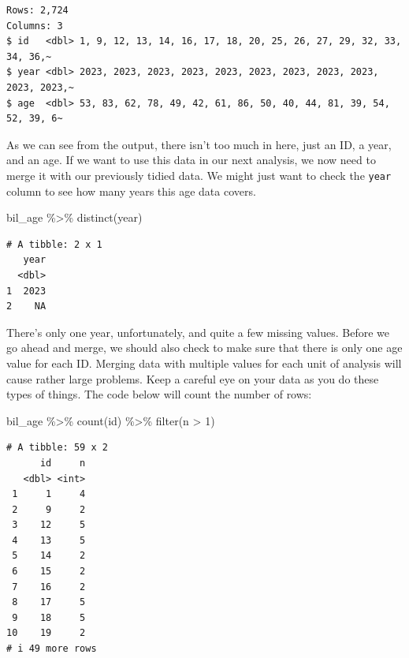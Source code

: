 \documentclass[
  letterpaper,
]{book}
\newenvironment{Shaded}{\begin{snugshade}}{\end{snugshade}}
\newcommand{\CommentTok}[1]{\textcolor[rgb]{0.37,0.37,0.37}{#1}}
\newcommand{\DecValTok}[1]{\textcolor[rgb]{0.68,0.00,0.00}{#1}}
\newcommand{\FunctionTok}[1]{\textcolor[rgb]{0.28,0.35,0.67}{#1}}
\newcommand{\NormalTok}[1]{\textcolor[rgb]{0.00,0.23,0.31}{#1}}
\newcommand{\SpecialCharTok}[1]{\textcolor[rgb]{0.37,0.37,0.37}{#1}}
\begin{document}
\begin{verbatim}
Rows: 2,724
Columns: 3
$ id   <dbl> 1, 9, 12, 13, 14, 16, 17, 18, 20, 25, 26, 27, 29, 32, 33, 34, 36,~
$ year <dbl> 2023, 2023, 2023, 2023, 2023, 2023, 2023, 2023, 2023, 2023, 2023,~
$ age  <dbl> 53, 83, 62, 78, 49, 42, 61, 86, 50, 40, 44, 81, 39, 54, 52, 39, 6~
\end{verbatim}

As we can see from the output, there isn't too much in here, just an ID,
a year, and an age. If we want to use this data in our next analysis, we
now need to merge it with our previously tidied data. We might just want
to check the \texttt{year} column to see how many years this age data
covers.

\begin{Shaded}
\begin{Highlighting}[]
\NormalTok{bil\_age }\SpecialCharTok{\%\textgreater{}\%}
  \FunctionTok{distinct}\NormalTok{(year)}
\end{Highlighting}
\end{Shaded}

\begin{verbatim}
# A tibble: 2 x 1
   year
  <dbl>
1  2023
2    NA
\end{verbatim}

\begin{Shaded}
\end{Shaded}

There's only one year, unfortunately, and quite a few missing values.
Before we go ahead and merge, we should also check to make sure that
there is only one age value for each ID. Merging data with multiple
values for each unit of analysis will cause rather large problems. Keep
a careful eye on your data as you do these types of things. The code
below will count the number of rows:

\begin{Shaded}
\begin{Highlighting}[]
\NormalTok{bil\_age }\SpecialCharTok{\%\textgreater{}\%}
  \FunctionTok{count}\NormalTok{(id) }\SpecialCharTok{\%\textgreater{}\%}
  \FunctionTok{filter}\NormalTok{(n }\SpecialCharTok{\textgreater{}} \DecValTok{1}\NormalTok{)}
\end{Highlighting}
\end{Shaded}

\begin{verbatim}
# A tibble: 59 x 2
      id     n
   <dbl> <int>
 1     1     4
 2     9     2
 3    12     5
 4    13     5
 5    14     2
 6    15     2
 7    16     2
 8    17     5
 9    18     5
10    19     2
# i 49 more rows
\end{verbatim}
\end{document}
